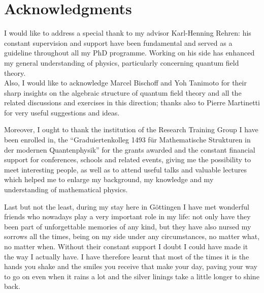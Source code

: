 
\begingroup
\let\clearpage\relax
\let\cleardoublepage\relax
\let\cleardoublepage\relax

\chapter*{Acknowledgments}
I would like to address a special thank to my advisor
Karl-Henning Rehren: his constant supervision and 
support have been fundamental and served as 
a guideline throughout all my PhD programme. 
Working on his side has enhanced my general understanding 
of physics, particularly concerning quantum field theory.\\
Also, I would like to acknowledge Marcel Bischoff and Yoh 
Tanimoto for their sharp insights on the algebraic 
structure of quantum field theory and all the related
discussions and exercises in this direction; thanks also
to Pierre Martinetti for very useful suggestions and 
ideas. 

\bigskip 
Moreover, I ought to thank the institution of the
Research Training Group I have been enrolled in, the 
``Graduiertenkolleg 1493 f\"ur
Mathematische Strukturen in der modernen Quantenphysik''
for the grants awarded and the constant financial support 
for conferences, schools and related events, giving me
the possibility to meet interesting people,
as well as to attend useful talks and valuable lectures 
which helped me to enlarge my background, my knowledge and 
my understanding of mathematical physics. 

\vspace{1cm}
Last but not the least, during my stay here in 
G\"ottingen I have met wonderful
friends who nowadays play a very important role in my life:
not only have they been part of unforgettable memories 
of any kind, but they have also nursed my sorrows all the times,
being on my side under any circumstances, no matter what, no 
matter when. Without their constant support I doubt I could 
have made it the way I actually have. I have therefore learnt
that most of the times it is the hands you shake and the smiles
you receive that make your day, paving your way to go on
even when it rains a lot and the silver linings take 
a little longer to shine back.
\endgroup



